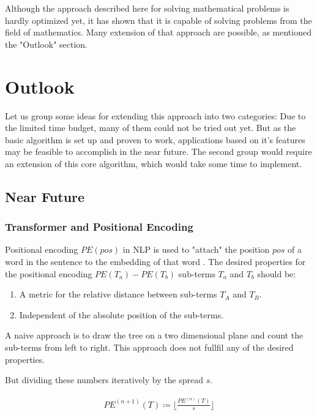 \documentclass{scrartcl}
\theoremstyle{definition}
\begin{document}
Although the approach described here for solving mathematical problems is hardly optimized yet,
it has shown that it is capable of solving problems from the field of mathematics.
Many extension of that approach are possible, as mentioned the "Outlook" section.


\section{Outlook}

Let us group some ideas for extending this approach into two categories:
Due to the limited time budget, many of them could not be tried out yet.
But as the basic algorithm is set up and proven to work, applications based on it's features may be feasible to accomplish in the near future.
The second group would require an extension of this core algorithm, which would take some time to implement.

\subsection{Near Future}

\subsubsection{Transformer and Positional Encoding}

Positional encoding $PE\left( pos\right)$ in NLP is used to "attach" the position $pos$ of a word in the sentence to the embedding of that word \cite{vaswani2017attention}.
The desired properties for the positional encoding $PE\left( T_a \right) - PE\left( T_b \right)$ sub-terms $T_a$ and $T_b$ should be:
\begin{enumerate}[label=(\roman*)]
	\item A metric for the relative distance between sub-terms $T_A$ and $T_B$.
	\item Independent of the absolute position of the sub-terms.
\end{enumerate}

A naive approach is to draw the tree on a two dimensional plane and count the sub-terms from left to right.
This approach does not fullfil any of the desired properties.

But dividing these numbers iteratively by the spread $s$.

\begin{align}
	PE^{(n+1)}\left( T \right) \coloneqq \lfloor \frac{PE^{(n)} \left( T \right)}{s} \rfloor
\end{align}
\end{document}

